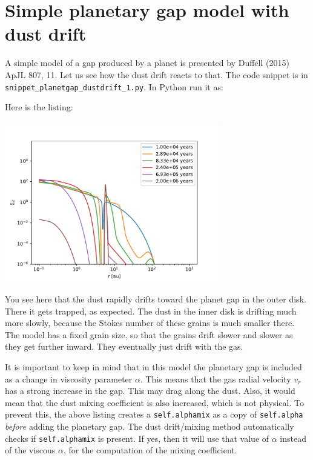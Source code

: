 \documentclass{book}
\newcommand{\code}[1]{{\small\tt #1}}
\begin{document}
\section{Simple planetary gap model with dust drift}
A simple model of a gap produced by a planet is presented by Duffell (2015) ApJL
807, 11. Let us see how the dust drift reacts to that. The code snippet is
in \code{snippet\_planetgap\_dustdrift\_1.py}. In Python run it as:
\begin{codebox}
\end{codebox}
Here is the listing:

\centerline{\includegraphics[width=0.7\textwidth]{../snippets/fig_snippet_planetgap_dustdrift_1_1.pdf}}
You see here that the dust rapidly drifts toward the planet gap in the outer disk.
There it gets trapped, as expected. The dust in the inner disk is drifting much
more slowly, because the Stokes number of these grains is much smaller there. The
model has a fixed grain size, so that the grains drift slower and slower as they
get further inward. They eventually just drift with the gas.

It is important to keep in mind that in this model the planetary gap is included
as a change in viscosity parameter $\alpha$. This means that the gas radial
velocity $v_r$ has a strong increase in the gap. This may drag along the
dust. Also, it would mean that the dust mixing coefficient is also increased, which
is not physical. To prevent this, the above listing creates a \code{self.alphamix}
as a copy of \code{self.alpha} {\em before} adding the planetary gap. The
dust drift/mixing method automatically checks if \code{self.alphamix} is present.
If yes, then it will use that value of $\alpha$ instead of the viscous $\alpha$,
for the computation of the mixing coefficient.
\end{document}
